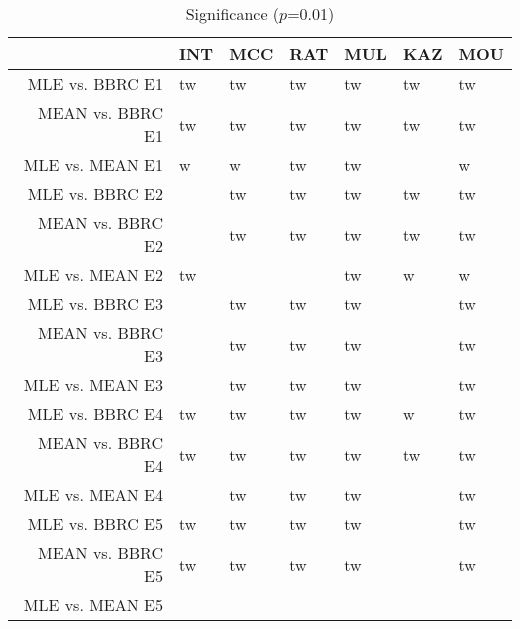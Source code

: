 \begin{table}[t]
\begin{center}
\begin{tabular}{rllllll}
  \hline
 & INT & MCC & RAT & MUL & KAZ & MOU \\ 
  \hline
MLE vs. BBRC E1 & tw & tw & tw & tw & tw & tw \\ 
  MEAN vs. BBRC E1 & tw & tw & tw & tw & tw & tw \\ 
  MLE vs. MEAN E1 & w & w & tw & tw &  & w \\ 
  MLE vs. BBRC E2 &  & tw & tw & tw & tw & tw \\ 
  MEAN vs. BBRC E2 &  & tw & tw & tw & tw & tw \\ 
  MLE vs. MEAN E2 & tw &  &  & tw & w & w \\ 
  MLE vs. BBRC E3 &  & tw & tw & tw &  & tw \\ 
  MEAN vs. BBRC E3 &  & tw & tw & tw &  & tw \\ 
  MLE vs. MEAN E3 &  & tw & tw & tw &  & tw \\ 
  MLE vs. BBRC E4 & tw & tw & tw & tw & w & tw \\ 
  MEAN vs. BBRC E4 & tw & tw & tw & tw & tw & tw \\ 
  MLE vs. MEAN E4 &  & tw & tw & tw &  & tw \\ 
  MLE vs. BBRC E5 & tw & tw & tw & tw &  & tw \\ 
  MEAN vs. BBRC E5 & tw & tw & tw & tw &  & tw \\ 
  MLE vs. MEAN E5 &  &  &  &  &  &  \\ 
   \hline
\end{tabular}
\caption{Significance ($p$=0.01)}
\label{t:sign}
\end{center}
\end{table}
